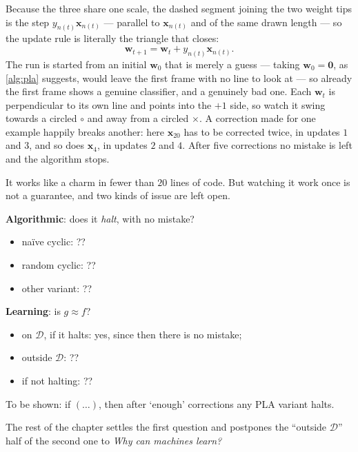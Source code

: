 Because the three share one scale, the dashed segment joining the two weight
tips is the step \(y_{n(t)} \bm{x}_{n(t)}\) --- parallel to
\(\bm{x}_{n(t)}\) and of the same drawn length --- so the update rule is
literally the triangle that closes:
\[
    \bm{w}_{t+1} = \bm{w}_t + y_{n(t)} \bm{x}_{n(t)} .
\]
The run is started from an initial \(\bm{w}_0\) that is merely a guess --- taking
\(\bm{w}_0 = \bm{0}\), as \autoref{alg:pla} suggests, would leave the first frame
with no line to look at --- so already the first frame shows a genuine
classifier, and a genuinely bad one. Each \(\bm{w}_t\) is perpendicular to its
own line and points into the \(+1\) side, so watch it swing towards a circled
\(\circ\) and away from a circled \(\times\). A correction made for one example
happily breaks another: here \(\bm{x}_{20}\) has to be corrected twice, in
updates \(1\) and \(3\), and so does \(\bm{x}_4\), in updates \(2\) and \(4\).
After five corrections no mistake is left and the algorithm stops.

It works like a charm in fewer than \(20\) lines of code. But watching it work
once is not a guarantee, and two kinds of issue are left open.

\begin{question}
    \textbf{Algorithmic}: does it \emph{halt}, with no mistake?
    \begin{itemize}
        \item naïve cyclic: ??
        \item random cyclic: ??
        \item other variant: ??
    \end{itemize}
    \textbf{Learning}: is \(g \approx f\)?
    \begin{itemize}
        \item on \(\mathcal{D}\), if it halts: yes, since then there is no
            mistake;
        \item outside \(\mathcal{D}\): ??
        \item if not halting: ??
    \end{itemize}
\end{question}

To be shown: if \((\dots)\), then after `enough' corrections any PLA variant
halts.

The rest of the chapter settles the first question and postpones the
``outside \(\mathcal{D}\)'' half of the second one to \emph{Why can machines
learn?}

